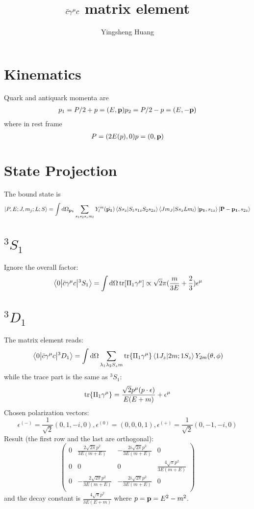 \documentclass{article}
\title{$\bar c\gm c$ matrix element}
\author{Yingsheng Huang}
\newcommand{\gm}{\gamma^{\mu}}
\newcommand{\la}{\lambda}
\begin{document}
\maketitle
\section{Kinematics}
Quark and antiquark momenta are
\begin{align}
    p_1=P/2+p=(E,\vb{p})
    p_2=P/2-p=(E,-\vb{p})
\end{align}
where in rest frame
\begin{align}
    P=(2E(p),0)
    p=(0,\vb{p})
\end{align}
\section{State Projection}
The bound state is\cite{Weinberg2015}
\begin{align}
    \ket{P,E;J,m_j;L;S}=\int\dd\Omega_{\vb{p_1}}\sum_{s_1s_2s_zm_l}Y_l^m(\hat{\vb{p_1}})\braket{Ss_z}{S_1s_{1z}S_2s_{2z}}\braket{Jm_J}{Ss_zLm_l}\ket{\vb{p_1},s_{1z}}\ket{\vb{P-p_1},s_{2z}}
\end{align}
\section{$^3S_1$}
Ignore the overall factor:
$$\mel{0}{\bar c\gm c}{^3S_1}=\int\dd\Omega\tr[\Pi_1\gm]\propto\sqrt{2}\pi(\frac{m}{3 E}+\frac{2}{3})\epsilon^{\mu}$$
\section{$^3D_1$}
The matrix element reads:
$$\mel{0}{\bar c\gm c}{^3D_1}=\int\dd\Omega\sum_{\la_1\la_2 S_zm}\tr{\Pi_1\gm}\braket{1J_z}{2m;1S_z}Y_{2m}(\theta,\phi)$$
while the trace part is the same as $^3S_1$:
$$\tr{\Pi_1\gm}=\frac{\sqrt{2}p^{\mu}(p\cdot\epsilon)}{E(E+m)}+\epsilon^{\mu}$$
Chosen polarization vectors: 
$$\epsilon^{(-)}=\frac{1}{\sqrt{2}}(0,1,-i,0),\epsilon^{(0)}=(0,0,0,1),\epsilon^{(+)}=\frac{1}{\sqrt{2}}(0,-1,-i,0)$$
Result (the first row and the last are orthogonal):  
$$\left(
\begin{array}{cccc}
 0 & \frac{2 \sqrt{2 \pi } p^2}{3 E (m+E)} & -\frac{2 i \sqrt{2 \pi } p^2}{3 E (m+E)} & 0 \\
 0 & 0 & 0 & \frac{4 \sqrt{\pi } p^2}{3 E (m+E)} \\
 0 & -\frac{2 \sqrt{2 \pi } p^2}{3 E (m+E)} & -\frac{2 i \sqrt{2 \pi } p^2}{3 E (m+E)} & 0 \\
\end{array}
\right)$$
and the decay constant is $\frac{4 \sqrt{\pi } p^2}{3 E (E+m)}$ where $p=\vb{p}=E^2-m^2$. 



\end{document}
